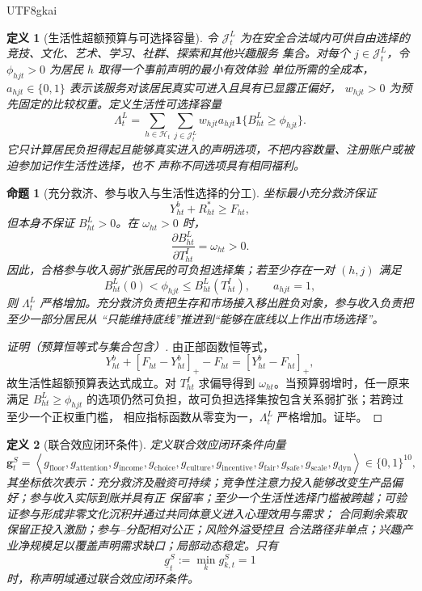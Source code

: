 \documentclass[12pt,a4paper,openany]{report}
\newtheorem{definition}{定义}[chapter]
\newtheorem{proposition}{命题}[chapter]
\newcommand{\Tuple}[1]{\left\langle #1\right\rangle}
\begin{document}
\begin{CJK*}{UTF8}{gkai}
\begin{definition}[生活性超额预算与可选择容量]
令 \(\mathcal J_t^L\) 为在安全合法域内可供自由选择的竞技、文化、艺术、学习、社群、探索和其他兴趣服务
集合。对每个 \(j\in\mathcal J_t^L\)，令 \(\phi_{hjt}>0\) 为居民 \(h\) 取得一个事前声明的最小有效体验
单位所需的全成本，\(a_{hjt}\in\{0,1\}\) 表示该服务对该居民真实可进入且具有已显露正偏好，
\(w_{hjt}>0\) 为预先固定的比较权重。定义生活性可选择容量
\[
  \Lambda_t^L
  =\sum_{h\in\mathcal H_t}\sum_{j\in\mathcal J_t^L}
  w_{hjt}a_{hjt}
  \mathbf 1\{B_{ht}^{L}\ge\phi_{hjt}\}.
\]
它只计算居民负担得起且能够真实进入的声明选项，不把内容数量、注册账户或被迫参加记作生活性选择，也不
声称不同选项具有相同福利。
\end{definition}

\begin{proposition}[充分救济、参与收入与生活性选择的分工]
\label{prop:floor-income-life-choice}
坐标最小充分救济保证
\[
  Y_{ht}^{b}+R_{ht}^{*}\ge F_{ht},
\]
但本身不保证 \(B_{ht}^{L}>0\)。在 \(\omega_{ht}>0\) 时，
\[
  \frac{\partial B_{ht}^{L}}{\partial T_{ht}^{I}}
  =\omega_{ht}>0.
\]
因此，合格参与收入弱扩张居民的可负担选择集；若至少存在一对 \((h,j)\) 满足
\[
  B_{ht}^{L}(0)<\phi_{hjt}
  \le B_{ht}^{L}(T_{ht}^{I}),
  \qquad a_{hjt}=1,
\]
则 \(\Lambda_t^L\) 严格增加。充分救济负责把生存和市场接入移出胜负对象，参与收入负责把至少一部分居民从
“只能维持底线”推进到“能够在底线以上作出市场选择”。
\end{proposition}

\begin{proof}[证明（预算恒等式与集合包含）]
由正部函数恒等式，
\[
  Y_{ht}^{b}+[F_{ht}-Y_{ht}^{b}]_+-F_{ht}
  =[Y_{ht}^{b}-F_{ht}]_+,
\]
故生活性超额预算表达式成立。对 \(T_{ht}^{I}\) 求偏导得到 \(\omega_{ht}\)。当预算弱增时，任一原来满足
\(B_{ht}^{L}\ge\phi_{hjt}\) 的选项仍然可负担，故可负担选择集按包含关系弱扩张；若跨过至少一个正权重门槛，
相应指标函数从零变为一，\(\Lambda_t^L\) 严格增加。证毕。
\end{proof}

\begin{definition}[联合效应闭环条件]
定义联合效应闭环条件向量
\[
  \mathbf g_t^{S}
  =\Tuple{
  g_{\mathrm{floor}},
  g_{\mathrm{attention}},
  g_{\mathrm{income}},
  g_{\mathrm{choice}},
  g_{\mathrm{culture}},
  g_{\mathrm{incentive}},
  g_{\mathrm{fair}},
  g_{\mathrm{safe}},
  g_{\mathrm{scale}},
  g_{\mathrm{dyn}}
  }\in\{0,1\}^{10},
\]
其坐标依次表示：充分救济及融资可持续；竞争性注意力投入能够改变生产品偏好；参与收入实际到账并具有正
保留率；至少一个生活性选择门槛被跨越；可验证参与形成非零文化沉积并通过共同体意义进入心理效用与需求；
合同剩余索取保留正投入激励；参与--分配相对公正；风险外溢受控且
合法路径非单点；兴趣产业净规模足以覆盖声明需求缺口；局部动态稳定。只有
\[
  \underline g_t^{S}:=\min_k g_{k,t}^{S}=1
\]
时，称声明域通过联合效应闭环条件。
\end{definition}


\end{CJK*}
\end{document}
